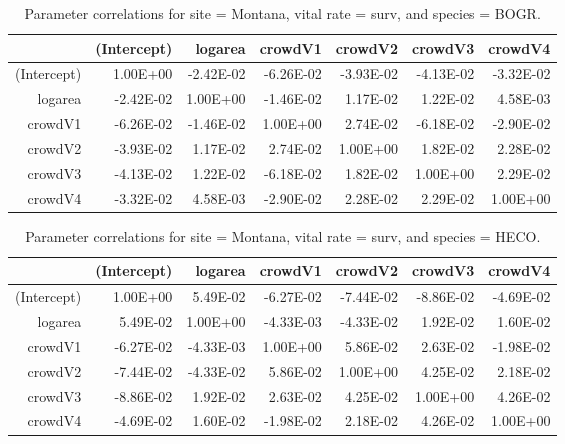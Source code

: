 \documentclass[12pt,]{article}
\begin{document}
\begin{table}[ht]
\centering
\caption{Parameter correlations for site = Montana, vital rate = surv, and species = BOGR.} 
\begin{tabular}{rrrrrrr}
  \hline
 & (Intercept) & logarea & crowdV1 & crowdV2 & crowdV3 & crowdV4 \\ 
  \hline
(Intercept) & 1.00E+00 & -2.42E-02 & -6.26E-02 & -3.93E-02 & -4.13E-02 & -3.32E-02 \\ 
  logarea & -2.42E-02 & 1.00E+00 & -1.46E-02 & 1.17E-02 & 1.22E-02 & 4.58E-03 \\ 
  crowdV1 & -6.26E-02 & -1.46E-02 & 1.00E+00 & 2.74E-02 & -6.18E-02 & -2.90E-02 \\ 
  crowdV2 & -3.93E-02 & 1.17E-02 & 2.74E-02 & 1.00E+00 & 1.82E-02 & 2.28E-02 \\ 
  crowdV3 & -4.13E-02 & 1.22E-02 & -6.18E-02 & 1.82E-02 & 1.00E+00 & 2.29E-02 \\ 
  crowdV4 & -3.32E-02 & 4.58E-03 & -2.90E-02 & 2.28E-02 & 2.29E-02 & 1.00E+00 \\ 
   \hline
\end{tabular}
\end{table}

\begin{table}[ht]
\centering
\caption{Parameter correlations for site = Montana, vital rate = surv, and species = HECO.} 
\begin{tabular}{rrrrrrr}
  \hline
 & (Intercept) & logarea & crowdV1 & crowdV2 & crowdV3 & crowdV4 \\ 
  \hline
(Intercept) & 1.00E+00 & 5.49E-02 & -6.27E-02 & -7.44E-02 & -8.86E-02 & -4.69E-02 \\ 
  logarea & 5.49E-02 & 1.00E+00 & -4.33E-03 & -4.33E-02 & 1.92E-02 & 1.60E-02 \\ 
  crowdV1 & -6.27E-02 & -4.33E-03 & 1.00E+00 & 5.86E-02 & 2.63E-02 & -1.98E-02 \\ 
  crowdV2 & -7.44E-02 & -4.33E-02 & 5.86E-02 & 1.00E+00 & 4.25E-02 & 2.18E-02 \\ 
  crowdV3 & -8.86E-02 & 1.92E-02 & 2.63E-02 & 4.25E-02 & 1.00E+00 & 4.26E-02 \\ 
  crowdV4 & -4.69E-02 & 1.60E-02 & -1.98E-02 & 2.18E-02 & 4.26E-02 & 1.00E+00 \\ 
   \hline
\end{tabular}
\end{table}
\end{document}
